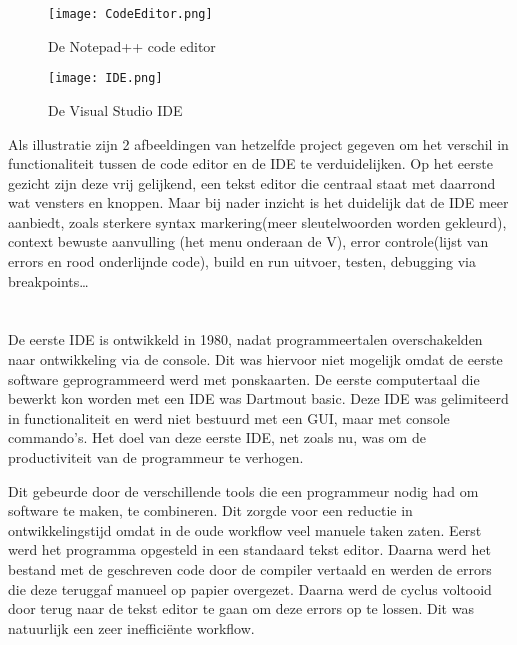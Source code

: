 \begin{figure}[h!]
    \texttt{[image: CodeEditor.png]}
    \caption{De Notepad++ code editor}
    \label{fig:codeEditor}
\end{figure}

\begin{figure}[h!]
    \texttt{[image: IDE.png]}
    \caption{De Visual Studio IDE}
    \label{fig:IDE}
\end{figure}

Als illustratie zijn 2 afbeeldingen van hetzelfde project gegeven om het verschil in functionaliteit tussen de code editor en de IDE te verduidelijken. Op het eerste gezicht zijn deze vrij gelijkend, een tekst editor die centraal staat met daarrond wat vensters en knoppen. Maar bij nader inzicht is het duidelijk dat de IDE meer aanbiedt, zoals sterkere syntax markering(meer sleutelwoorden worden gekleurd), context bewuste aanvulling (het menu onderaan de V), error controle(lijst van errors en rood onderlijnde code), build en run uitvoer, testen, debugging via breakpoints…

\section{}
\label{sec:IDE-ontstaan}

De eerste IDE is ontwikkeld in 1980, nadat programmeertalen overschakelden naar ontwikkeling via de console. Dit was hiervoor niet mogelijk omdat de eerste software geprogrammeerd werd met ponskaarten. De eerste computertaal die bewerkt kon worden met een IDE was Dartmout basic. Deze IDE was gelimiteerd in functionaliteit en werd niet bestuurd met een GUI, maar met console commando’s. Het doel van deze eerste IDE, net zoals nu, was om de productiviteit van de programmeur te verhogen. \autocite{JAXenter2018}

Dit gebeurde door de verschillende tools die een programmeur nodig had om software te maken, te combineren. Dit zorgde voor een reductie in ontwikkelingstijd omdat in de oude workflow veel manuele taken zaten. Eerst werd het programma opgesteld in een standaard tekst editor. Daarna werd het bestand met de geschreven code door de compiler vertaald en werden de errors die deze teruggaf manueel op papier overgezet. Daarna werd de cyclus voltooid door terug naar de tekst editor te gaan om deze errors op te lossen. Dit was natuurlijk een zeer inefficiënte workflow. 

